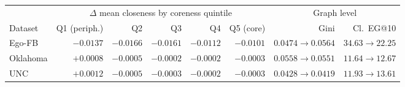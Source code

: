 \begin{tabular}{lrrrrrrr}
\toprule
 & \multicolumn{5}{c}{$\Delta$ mean closeness by coreness quintile} & \multicolumn{2}{c}{Graph level} \\
\cmidrule(lr){2-6}\cmidrule(lr){7-8}
Dataset & Q1 (periph.) & Q2 & Q3 & Q4 & Q5 (core) & Gini & Cl.\ EG@10 \\
\midrule
Ego-FB & $-0.0137$ & $-0.0166$ & $-0.0161$ & $-0.0112$ & $-0.0101$ & $0.0474 \to 0.0564$ & $34.63 \to 22.25$ \\
Oklahoma & $+0.0008$ & $-0.0005$ & $-0.0002$ & $-0.0002$ & $-0.0003$ & $0.0558 \to 0.0551$ & $11.64 \to 12.67$ \\
UNC & $+0.0012$ & $-0.0005$ & $-0.0003$ & $-0.0002$ & $-0.0003$ & $0.0428 \to 0.0419$ & $11.93 \to 13.61$ \\
\bottomrule
\end{tabular}
